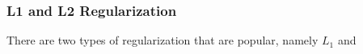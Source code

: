 \subsubsection{L1 and L2 Regularization}

There are two types of regularization that are popular, namely $L_1$ and 
